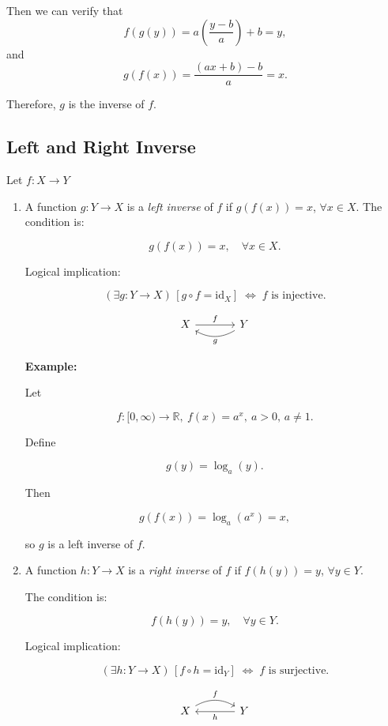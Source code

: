\documentclass[12pt,a4paper,openany]{article}
\begin{document}
Then we can verify that
\[
f(g(y)) = a \left( \frac{y - b}{a} \right) + b = y,
\]
and
\[
g(f(x)) = \frac{(a x + b) - b}{a} = x.
\]

Therefore, $g$ is the inverse of $f$.

\subsection{Left and Right Inverse}

Let $f : X \to Y$

\begin{enumerate}
\item A function $g : Y \to X$ is a \textit{left inverse} of $f$ if $g(f(x)) = x$,  $\forall x \in X$.
    The condition is:

    \[
    g(f(x)) = x, \quad \forall x \in X.
    \]

    Logical implication:

    \[
    (\exists g : Y \to X)\,[g \circ f = \mathrm{id}_X]
    \;\Longleftrightarrow\;
    f \text{ is injective}.
    \]

    \[
    \begin{tikzcd}[row sep=large, column sep=large]
    X \arrow[r, "f"]
    & Y \arrow[l, bend left=30, "g"]
    \end{tikzcd}
    \]

    \textbf{Example:}

    Let

    \[
    f: [0, \infty) \to \mathbb{R}, \
    f(x) = a^x, \ a > 0,\, a \ne 1.
    \]

    Define 

    \[
    g(y) = \log_a(y).
    \]

    Then

    \[
    g(f(x)) = \log_a(a^x) = x,
    \]

    so $g$ is a left inverse of $f$.

\item A function $h : Y \to X$ is a \textit{right inverse} of $f$ if $f(h(y)) = y$,  $\forall y \in Y$.

    The condition is:

    \[
    f(h(y)) = y, \quad \forall y \in Y.
    \]

    Logical implication:

    \[
    (\exists h : Y \to X)\,[f \circ h = \mathrm{id}_Y]
    \;\Longleftrightarrow\;
    f \text{ is surjective}.
    \]

    \[
    \begin{tikzcd}[row sep=large, column sep=large]
    X \arrow[r, bend left=30, "f"]
    & Y \arrow[l, "h"]
    \end{tikzcd}
    \]


\end{enumerate}
\end{document}
